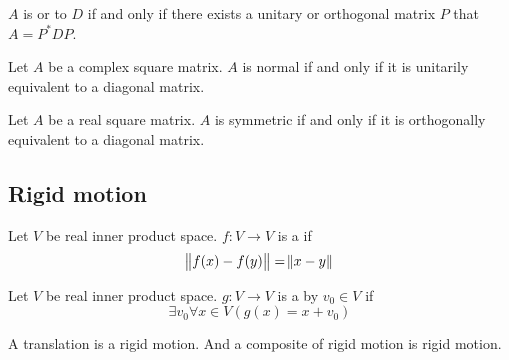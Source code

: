 \begin{definition}
    $A$ is  or  to $D$ if and only if there exists a unitary or orthogonal matrix $P$ that $A = P^* D P$.
\end{definition}

\begin{theorem}
    Let $A$ be a complex square matrix. $A$ is normal if and only if it is unitarily equivalent to a diagonal matrix.    
\end{theorem}

\begin{theorem}
    Let $A$ be a real square matrix. $A$ is symmetric if and only if it is orthogonally equivalent to a diagonal matrix.    
\end{theorem}






\subsection{Rigid motion}

\begin{definition}
    Let $V$ be real inner product space. $f: V \rightarrow V$ is a  if 
    \begin{equation}
        \norm{f(x) - f(y)} = \norm{x - y}
    \end{equation}
\end{definition}

\begin{definition}
    Let $V$ be real inner product space. $g: V \rightarrow V$ is a  by $v_0 \in V$ if
    \begin{equation}
        \exists v_0 \forall x \in V \left( g(x) = x + v_0 \right)
    \end{equation}
\end{definition}

\begin{theorem}
    A translation is a rigid motion. And a composite of rigid motion is rigid motion.    
\end{theorem}


